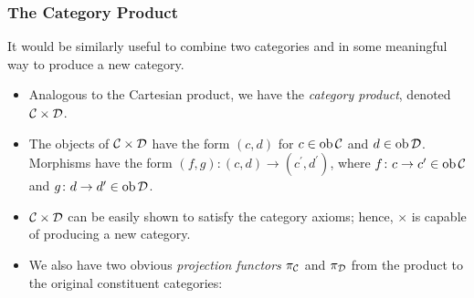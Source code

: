 \documentclass{beamer}
\numberwithin{figure}{section}
\begin{document}
\begin{frame}
        \frametitle{The Category Product}
        It would be similarly useful to combine two categories and in some
        meaningful way to produce a new category.
        \pause
        \begin{itemize}
                \item Analogous to the Cartesian product, we have the
                        \emph{category product}, denoted $\mathcal{C} \times
                        \mathcal{D}$.
                \item The objects of $\mathcal{C} \times \mathcal{D}$ have the
                        form $(c,d)$ for $c \in \operatorname{ob} \mathcal{C}$ and $d \in
                        \operatorname{ob} \mathcal{D}$. Morphisms have the form $(f,g)
                        \colon (c,d) \to (c^\prime,d^\prime)$, where
                        $f \colon c \to c^\prime \in \operatorname{ob} \mathcal{C}$ and
                        $g \colon d \to d^\prime \in \operatorname{ob} \mathcal{D}$.
                \item $\mathcal{C} \times \mathcal{D}$ can be easily shown to
                        satisfy the category axioms; hence, $\times$ is capable
                        of producing a new category.
                \item We also have two obvious \emph{projection functors}
                        $\pi_\mathcal{C}$ and $\pi_\mathcal{D}$ from the product
                        to the original constituent categories:

                        \vspace{1em}
                        \begin{figure}
                        \end{figure}
        \end{itemize}
\end{frame}
\end{document}
